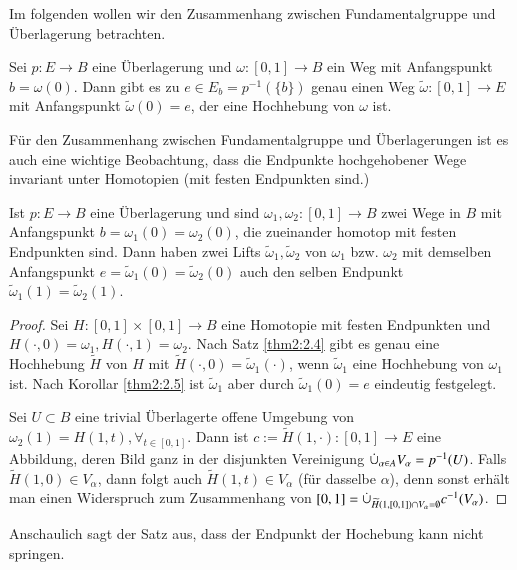 \documentclass[a4paper,10pt]{scrartcl}
\begin{document}
Im folgenden wollen wir den Zusammenhang zwischen Fundamentalgruppe und Überlagerung betrachten.
\begin{kor} \label{thm2:2.5}
 Sei $p:E\to B$ eine Überlagerung und $\omega:[0,1]\to B$ ein Weg mit Anfangspunkt $b=\omega(0)$. Dann gibt es zu $e\in E_b=p^{-1}(\{b\})$ genau einen Weg $\tilde \omega: [0,1] \to E$ mit Anfangspunkt $\tilde \omega(0)=e$, der eine Hochhebung von $\omega$ ist.
\end{kor}
Für den Zusammenhang zwischen Fundamentalgruppe und Überlagerungen ist es auch eine wichtige Beobachtung, dass die Endpunkte hochgehobener Wege invariant unter Homotopien (mit festen Endpunkten sind.) 
\begin{kor}\label{thm2:2.6}
 Ist $p: E\to B$ eine Überlagerung und sind $ \omega_1, \omega_2: [0,1]\to B$ zwei Wege in $B$ mit Anfangspunkt $b=\omega_1(0)=\omega_2(0)$, 
die zueinander homotop mit festen Endpunkten sind.  Dann haben zwei Lifts $\tilde \omega_1, \tilde \omega_2$ von $\omega_1$ bzw.  $\omega_2$ mit demselben Anfangspunkt $e=\tilde \omega_1(0)= \tilde \omega_2(0)$ auch den selben Endpunkt $\tilde \omega_1(1)=\tilde \omega_2(1)$.
\end{kor}
\begin{proof}
 Sei $H: [0,1] \times [0,1]\to B$ eine Homotopie mit festen Endpunkten und $H(\cdot, 0)=\omega_1, H(\cdot, 1)=\omega_2 $. Nach Satz \ref{thm2:2.4} gibt es genau eine Hochhebung $\tilde H$ von $H$ mit $\tilde H(\cdot, 0)=\tilde \omega_1(\cdot)$, wenn $\tilde \omega_1$ eine Hochhebung von $\omega_1$ ist. 
Nach Korollar \ref{thm2:2.5} ist $\tilde \omega_1$ aber durch $\tilde \omega_1(0)=e$ eindeutig festgelegt.

Sei $U\subset B$ eine trivial Überlagerte offene Umgebung von $\omega_2(1)=H(1,t), \forall_{t \in [0,1]}$. Dann ist $c:= \tilde H(1, \cdot): [0,1]\to E$ eine Abbildung, deren Bild ganz in der disjunkten Vereinigung $\mathbin{\dot{\cup}}_{\alpha\in A} V_\alpha=p^{-1}(U)$. 
Falls $\tilde H(1,0)\in V_\alpha$, dann folgt auch $\tilde H(1,t) \in V_\alpha$ (für dasselbe $\alpha$), denn sonst erhält man einen Widerspruch zum Zusammenhang von $[0,1]=\mathbin{\dot{\cup}}_{\widetilde H(1,[0,1])\cap V_\alpha=\emptyset} c^{-1}(V_\alpha)$.
\end{proof}
Anschaulich sagt der Satz aus, dass der Endpunkt der Hochebung kann nicht springen.
\end{document}
